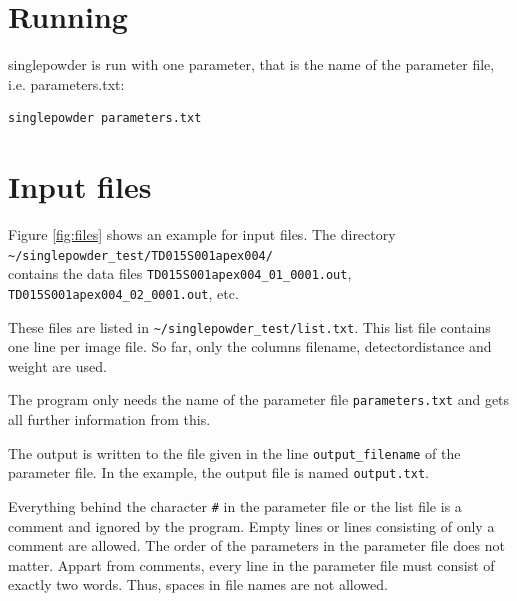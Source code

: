 \documentclass[a4paper, 12pt, twoside]{scrartcl}
\begin{document}
\section{Running}

singlepowder is run with one parameter, that is the name of the parameter file, i.e. parameters.txt:\\
\begin{verbatim}
singlepowder parameters.txt
\end{verbatim}

\section{Input files}

Figure \ref{fig:files} shows an example for input files. The directory \\
\verb|~/singlepowder_test/TD015S001apex004/|\\
contains the data files \verb|TD015S001apex004_01_0001.out|, \verb|TD015S001apex004_02_0001.out|, etc.

These files are listed in \verb|~/singlepowder_test/list.txt|. This list file contains one line per image file. So far, only the columns filename, detectordistance and weight are used.

The program only needs the name of the parameter file \verb|parameters.txt| and gets all further information from this.

The output is written to the file given in the line \verb|output_filename| of the parameter file. In the example, the output file is named \verb|output.txt|.

Everything behind the character \verb|#| in the parameter file or the list file is a comment and ignored by the program. Empty lines or lines consisting of only a comment are allowed. The order of the parameters in the parameter file does not matter. Appart from comments, every line in the parameter file must consist of exactly two words. Thus, spaces in file names are not allowed.
\end{document}
